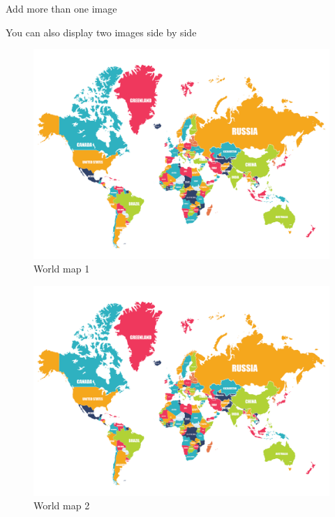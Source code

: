 \documentclass[aspectratio=169]{beamer} %
\begin{document}
\begin{frame}{Add more than one image}

You can also display two images side by side

	\begin{multicols}{2}

		\begin{figure}
			\centering
			\includegraphics[width=\linewidth]{img/world-map}
			\caption{World map 1}
			\label{fig:world-map1}
		\end{figure}
		\begin{figure}
			\centering
			\includegraphics[width=\linewidth]{img/world-map}
			\caption{World map 2}
			\label{fig:world-map2}
		\end{figure}

	\end{multicols}

\end{frame}
\end{document}
